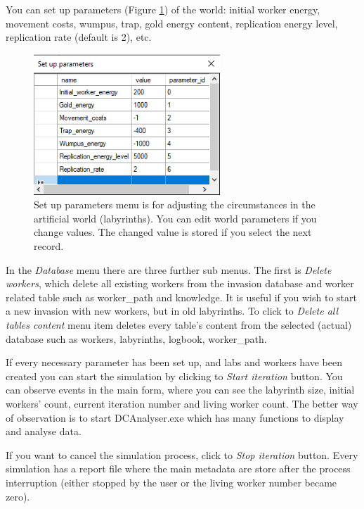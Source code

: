 \documentclass[a4paper,12pt]{article}
\begin{document}
 
You can set up parameters (Figure \ref{fig:mnu_showparameters}) of the world: initial worker energy, movement costs, wumpus, trap, gold energy content, replication energy level, replication rate (default is 2), etc. 

\begin{figure}
	\begin{center}
		\includegraphics[width=7cm]{mnu_showparameter.png}
		\caption{Set up parameters menu is for adjusting the circumstances in the artificial world (labyrinths). You can edit world parameters if you change values. The changed value is stored if you select the next record.}
		\label{fig:mnu_showparameters}
	\end{center}
\end{figure}


In the \textit{Database} menu there are three further sub menus. The first is \textit{Delete workers}, which delete all existing workers from the invasion database and worker related table such as worker\_path and knowledge. It is useful if you wish to start a new invasion with new workers, but in old labyrinths. To click to \textit{Delete all tables content} menu item deletes every table's content from the selected (actual) database such as workers, labyrinths, logbook, worker\_path. %

If every necessary parameter has been set up, and labs and workers have been created you can start the simulation by clicking to  \textit{Start iteration} button. You can observe  events in the main form, where you can see the labyrinth size, initial workers' count, current iteration number and living worker count. The better way of observation is to start DCAnalyser.exe which has many functions to display and analyse data.

If you want to cancel the simulation process, click to \textit{Stop iteration} button. Every simulation has a report file where the main metadata are store after the process interruption (either stopped by the user or the living worker number became zero).
\end{document}
